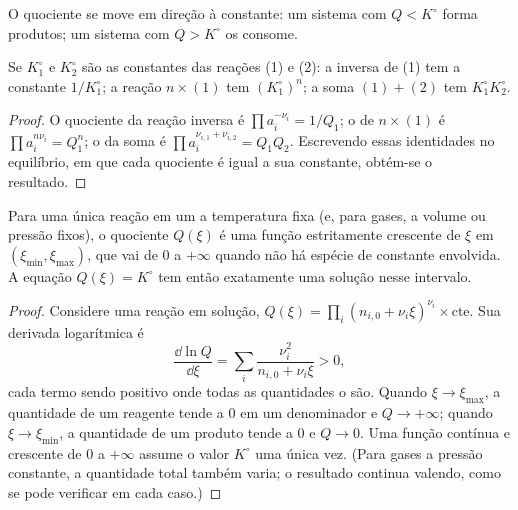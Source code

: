 \begin{omfigure}

{\small O quociente se move em direção à constante: um sistema com $Q <
K^\circ$ forma produtos; um sistema com $Q > K^\circ$ os consome.}
\end{omfigure}

\begin{proposition}\label{prop:b1:extent-q-and-k:combine-k}
Se $K_1^\circ$ e $K_2^\circ$ são as constantes das reações (1) e (2):
a inversa de (1) tem a constante $1/K_1^\circ$; a reação $n \times
(1)$ tem $(K_1^\circ)^n$; a soma $(1) + (2)$ tem $K_1^\circ K_2^\circ$.
\end{proposition}

\begin{proof}
O quociente da reação inversa é $\prod a_i^{-\nu_i} = 1/Q_1$; o de
$n \times (1)$ é $\prod a_i^{n\nu_i} = Q_1^n$; o da soma é
$\prod a_i^{\nu_{i,1} + \nu_{i,2}} = Q_1 Q_2$. Escrevendo essas
identidades no equilíbrio, em que cada quociente é igual a sua
constante, obtém-se o resultado.
\end{proof}

\begin{proposition}\label{prop:b1:extent-q-and-k:q-monotone}
Para uma única reação em um  a temperatura fixa (e, para
gases, a volume ou pressão fixos), o quociente $Q(\xi)$ é uma função
estritamente crescente de $\xi$ em $(\xi_{\min}, \xi_{\max})$, que vai de 0
a $+\infty$ quando não há espécie de  constante envolvida. A
equação $Q(\xi) = K^\circ$ tem então exatamente uma solução nesse
intervalo.
\end{proposition}

\begin{proof}
Considere uma reação em solução, $Q(\xi) = \prod_i (n_{i,0} + \nu_i\xi)^{\nu_i}
\times \text{cte}$. Sua derivada logarítmica é
\[
  \frac{\dd \ln Q}{\dd \xi} = \sum_i \frac{\nu_i^2}{n_{i,0} + \nu_i \xi}
  > 0 ,
\]
cada termo sendo positivo onde todas as quantidades o são. Quando
$\xi \to \xi_{\max}$, a quantidade de um reagente tende a 0 em um
denominador e $Q \to +\infty$; quando $\xi
\to \xi_{\min}$, a quantidade de um produto tende a 0 e $Q \to 0$. Uma
função contínua e crescente de 0 a $+\infty$ assume o valor $K^\circ$
uma única vez. (Para gases a pressão constante, a quantidade total também
varia; o resultado continua valendo, como se pode verificar em cada
caso.)
\end{proof}

